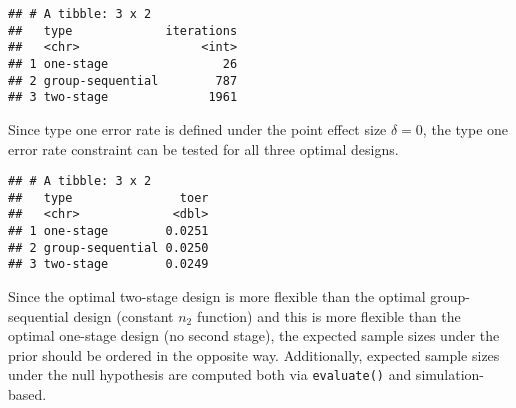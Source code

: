 \documentclass[
]{book}
\newenvironment{Shaded}{\begin{snugshade}}{\end{snugshade}}
\newcommand{\AttributeTok}[1]{\textcolor[rgb]{0.77,0.63,0.00}{#1}}
\newcommand{\DecValTok}[1]{\textcolor[rgb]{0.00,0.00,0.81}{#1}}
\newcommand{\FunctionTok}[1]{\textcolor[rgb]{0.00,0.00,0.00}{#1}}
\newcommand{\NormalTok}[1]{#1}
\newcommand{\SpecialCharTok}[1]{\textcolor[rgb]{0.00,0.00,0.00}{#1}}
\begin{document}
\begin{verbatim}
## # A tibble: 3 x 2
##   type             iterations
##   <chr>                 <int>
## 1 one-stage                26
## 2 group-sequential        787
## 3 two-stage              1961
\end{verbatim}

Since type one error rate is defined under the point effect size \(\delta=0\), the type one error rate constraint can be tested for all three optimal designs.

\begin{Shaded}
\end{Shaded}

\begin{verbatim}
## # A tibble: 3 x 2
##   type               toer
##   <chr>             <dbl>
## 1 one-stage        0.0251
## 2 group-sequential 0.0250
## 3 two-stage        0.0249
\end{verbatim}

Since the optimal two-stage design is more flexible than the optimal group-sequential design (constant \(n_2\) function) and this is more flexible than the optimal one-stage design (no second stage), the expected sample sizes under the prior should be ordered in the opposite way. Additionally, expected sample sizes under the null hypothesis are computed both via \texttt{evaluate()} and simulation-based.
\end{document}
